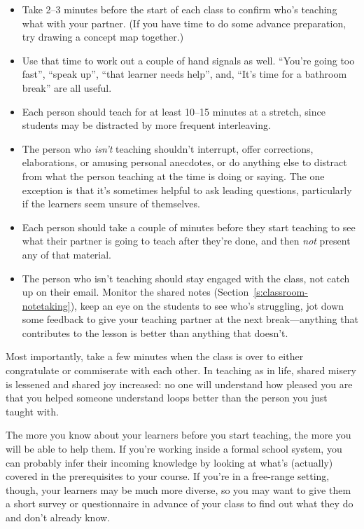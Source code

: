\begin{itemize}
\item
  Take 2--3 minutes before the start of each class to confirm who's
  teaching what with your partner. (If you have time to do some
  advance preparation, try drawing a concept map together.)
\item
  Use that time to work out a couple of hand signals as well. ``You're
  going too fast'', ``speak up'', ``that learner needs help'', and, ``It's
  time for a bathroom break'' are all useful.
\item
  Each person should teach for at least 10--15 minutes at a stretch,
  since students may be distracted by more frequent interleaving.
\item
  The person who \emph{isn't} teaching shouldn't interrupt, offer
  corrections, elaborations, or amusing personal anecdotes, or do
  anything else to distract from what the person teaching at the time
  is doing or saying. The one exception is that it's sometimes helpful
  to ask leading questions, particularly if the learners seem unsure
  of themselves.
\item
  Each person should take a couple of minutes before they start
  teaching to see what their partner is going to teach after they're
  done, and then \emph{not} present any of that material.
\item
  The person who isn't teaching should stay engaged with the class,
  not catch up on their email. Monitor the shared notes
  (Section~\ref{s:classroom-notetaking}), keep an eye on the students
  to see who's struggling, jot down some feedback to give your
  teaching partner at the next break---anything that contributes to the
  lesson is better than anything that doesn't.
\end{itemize}

Most importantly, take a few minutes when the class is over to either
congratulate or commiserate with each other. In teaching as in life,
shared misery is lessened and shared joy increased: no one will
understand how pleased you are that you helped someone understand loops
better than the person you just taught with.


The more you know about your learners before you start teaching, the
more you will be able to help them. If you're working inside a formal
school system, you can probably infer their incoming knowledge by
looking at what's (actually) covered in the prerequisites to your
course. If you're in a free-range setting, though, your learners may be
much more diverse, so you may want to give them a short survey or
questionnaire in advance of your class to find out what they do and
don't already know.

